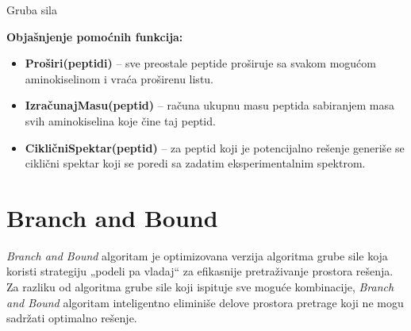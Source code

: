 \documentclass[12pt,oneside]{memoir}
\begin{document}
\begin{algorithm}[H]
\label{alg:brute_force}
\caption{Gruba sila}
\SetAlgoLined
\DontPrintSemicolon
{}
\end{algorithm}

\noindent
\textbf{Objašnjenje pomoćnih funkcija:}
\begin{itemize}
  \item \textbf{Proširi(peptidi)} – sve preostale peptide proširuje sa svakom mogućom aminokiselinom i vraća proširenu listu.
  \item \textbf{IzračunajMasu(peptid)} – računa ukupnu masu peptida sabiranjem masa svih aminokiselina koje čine taj peptid.
  \item \textbf{CikličniSpektar(peptid)} – za peptid koji je potencijalno rešenje generiše se ciklični spektar koji se poredi sa zadatim eksperimentalnim spektrom.
\end{itemize}

\section{Branch and Bound}
\emph{Branch and Bound} algoritam \cite{online_lecture, online_book} je optimizovana verzija algoritma grube sile koja koristi strategiju „podeli pa vladaj“ za efikasnije pretraživanje prostora rešenja. Za razliku od algoritma grube sile koji ispituje sve moguće kombinacije, \emph{Branch and Bound} algoritam inteligentno eliminiše delove prostora pretrage koji ne mogu sadržati optimalno rešenje.
\end{document}
